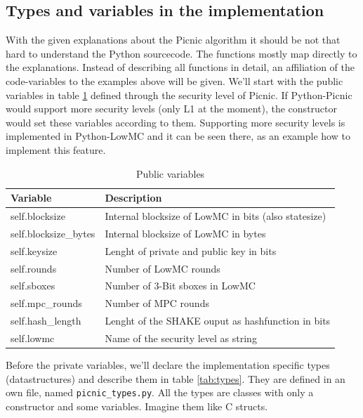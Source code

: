 \documentclass[]{article}
\begin{document}
\subsection{Types and variables in the implementation}
With the given explanations about the Picnic algorithm it should be not that hard to understand the Python sourcecode. The functions mostly map directly to the explanations. Instead of describing all functions in detail, an affiliation of the code-variables to the examples above will be given. We'll start with the public variables in table \ref{tab:secparams} defined through the security level of Picnic. If Python-Picnic would support more security levels (only L1 at the moment), the constructor would set these variables according to them. Supporting more security levels is implemented in Python-LowMC and it can be seen there, as an example how to implement this feature.\newpage
\begin{table}[htbp]
\begin{center}
\begin{tabular}{|l|l|}
\hline
\textbf{Variable}  & \textbf{Description} \\ \hline
self.blocksize  &  Internal blocksize of LowMC in bits (also statesize)\\ \hline
self.blocksize\_bytes  &  Internal blocksize of LowMC in bytes\\ \hline
self.keysize  &  Lenght of private and public key in bits\\ \hline
self.rounds  &  Number of LowMC rounds\\ \hline
self.sboxes  &  Number of 3-Bit sboxes in LowMC\\ \hline
self.mpc\_rounds  &  Number of MPC rounds\\ \hline
self.hash\_length  &  Lenght of the SHAKE ouput as hashfunction in bits\\ \hline
self.lowmc  &  Name of the security level as string\\ \hline
\end{tabular}
\caption{Public variables}
\label{tab:secparams}
\end{center}
\end{table}
\noindent Before the private variables, we'll declare the implementation specific types (datastructures) and describe them in table \ref{tab:types}. They are defined in an own file, named \texttt{picnic\_types.py}. All the types are classes with only a constructor and some variables. Imagine them like C structs.\\
\end{document}
